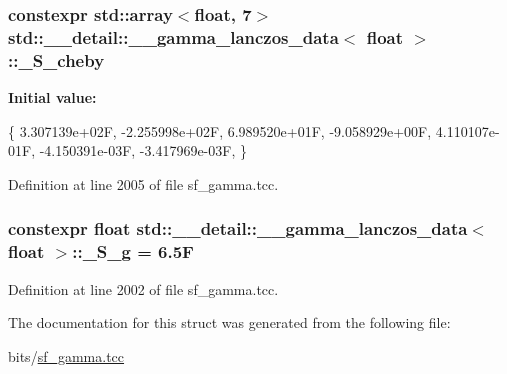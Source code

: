 \subsubsection[{\texorpdfstring{\+\_\+\+S\+\_\+cheby}{_S_cheby}}]{\setlength{\rightskip}{0pt plus 5cm}constexpr std\+::array$<$float, 7$>$ {\bf std\+::\+\_\+\+\_\+detail\+::\+\_\+\+\_\+gamma\+\_\+lanczos\+\_\+data}$<$ float $>$\+::\+\_\+\+S\+\_\+cheby\hspace{0.3cm}{\ttfamily [static]}}\hypertarget{structstd_1_1____detail_1_1____gamma__lanczos__data_3_01float_01_4_a2c49be7a79e21754e583099068cc1c3a}{}\label{structstd_1_1____detail_1_1____gamma__lanczos__data_3_01float_01_4_a2c49be7a79e21754e583099068cc1c3a}
{\bfseries Initial value\+:}
\begin{DoxyCode}
\{
     3.307139e+02F,
    -2.255998e+02F,
     6.989520e+01F,
    -9.058929e+00F,
     4.110107e-01F,
    -4.150391e-03F,
    -3.417969e-03F,
      \}
\end{DoxyCode}


Definition at line 2005 of file sf\+\_\+gamma.\+tcc.

\subsubsection[{\texorpdfstring{\+\_\+\+S\+\_\+g}{_S_g}}]{\setlength{\rightskip}{0pt plus 5cm}constexpr float {\bf std\+::\+\_\+\+\_\+detail\+::\+\_\+\+\_\+gamma\+\_\+lanczos\+\_\+data}$<$ float $>$\+::\+\_\+\+S\+\_\+g = 6.\+5F\hspace{0.3cm}{\ttfamily [static]}}\hypertarget{structstd_1_1____detail_1_1____gamma__lanczos__data_3_01float_01_4_aadc6da66fb542d6b88ddf3a0aef6249c}{}\label{structstd_1_1____detail_1_1____gamma__lanczos__data_3_01float_01_4_aadc6da66fb542d6b88ddf3a0aef6249c}


Definition at line 2002 of file sf\+\_\+gamma.\+tcc.



The documentation for this struct was generated from the following file\+:\begin{DoxyCompactItemize}
\item 
bits/\hyperlink{sf__gamma_8tcc}{sf\+\_\+gamma.\+tcc}\end{DoxyCompactItemize}
